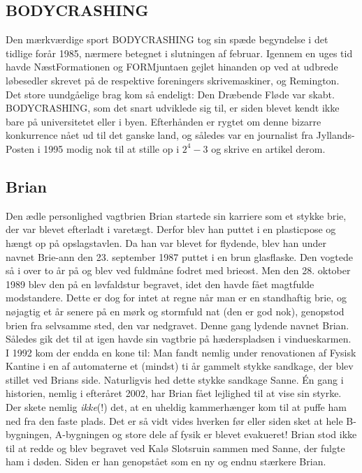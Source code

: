 \subsection{BODYCRASHING}
Den mærkværdige sport BODYCRASHING tog sin spæde begyndelse i det tidlige forår 1985, nærmere betegnet i slutningen af februar. Igennem en uges tid havde NæstFormationen og FORMjuntaen gejlet hinanden op ved at udbrede løbesedler skrevet på de respektive foreningers skrivemaskiner, \RemToR og Remington. Det store uundgåelige brag kom så endeligt: Den Dræbende Fløde var skabt. BODYCRASHING, som det snart udviklede sig til, er siden blevet kendt ikke bare på universitetet eller i byen. Efterhånden er rygtet om denne bizarre konkurrence nået ud til det ganske land, og således var en journalist fra Jyllands-Posten i 1995 modig nok til at stille op i $2^4 - 3$ og skrive en artikel derom.

\subsection{Brian}
Den ædle personlighed vagtbrien Brian startede sin karriere som et stykke brie, der var blevet efterladt i \TKETs varetægt. Derfor blev han puttet i en plasticpose og hængt op på opslagstavlen. Da han var blevet for flydende, blev han under navnet Brie-ann den 23. september 1987 puttet i en brun glasflaske. Den vogtede så i over to år på \TKET og blev ved fuldmåne fodret med brieost. Men den 28. oktober 1989 blev den på en løvfaldstur begravet, idet den havde fået magtfulde modstandere. Dette er dog for intet at regne når man er en standhaftig brie, og nøjagtig et år senere på en mørk og stormfuld nat (den er god nok), genopstod brien fra selvsamme sted, den var nedgravet. Denne gang lydende navnet Brian. Således gik det til at \TKET igen havde sin vagtbrie på hæderspladsen i vindueskarmen. I 1992 kom der endda en kone til: Man fandt nemlig under renovationen af Fysisk Kantine i en af automaterne et (mindst) ti år gammelt stykke sandkage, der blev stillet ved Brians side. Naturligvis hed dette stykke sandkage Sanne. Én gang i historien, nemlig i efteråret 2002, har Brian fået lejlighed til at vise sin styrke. Der skete nemlig \textit{ikke}(!) det, at en uheldig kammerhænger kom til at puffe ham ned fra den faste plads. Det er så vidt vides hverken før eller siden sket at hele B-bygningen, A-bygningen og store dele af fysik er blevet evakueret! Brian stod ikke til at redde og blev begravet ved Kalø Slotsruin sammen med Sanne, der fulgte ham i døden. Siden er han genopstået som en ny og endnu stærkere Brian.

